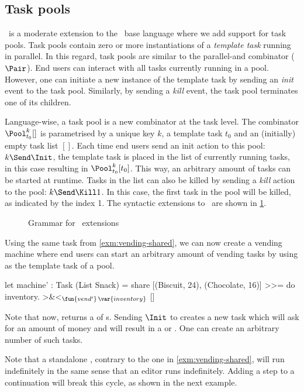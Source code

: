 \subsection{Task pools}

\DYNTOPHAT\ is a moderate extension to the \TOPHAT\ base language where we add support for task pools.
Task pools contain zero or more instantiations of a \emph{template task} running in parallel.
In this regard, task pools are similar to the parallel-and combinator ($\Pair$).
End users can interact with all tasks currently running in a pool.
However, one can initiate a new instance of the template task by sending an \emph{init} event to the task pool.
Similarly, by sending a \emph{kill} event, the task pool terminates one of its children.

Language-wise, a task pool is a new combinator at the task level.
The combinator $\Pool^k_{t_0} []$ is parametrised by a unique key $k$, a template task $t_0$ and an (initially) empty task list $[]$.
Each time end users send an init action to this pool: $k\Send\Init$, the template task is placed in the list of currently running tasks,
in this case resulting in $\Pool^k_{t_0} [t_0]$.
This way, an arbitrary amount of tasks can be started at runtime.
Tasks in the list can also be killed by sending a \emph{kill} action to the pool: $k\Send\Kill1$.
In this case, the first task in the pool will be killed, as indicated by the index 1.
The syntactic extensions to \TOPHAT\ are shown in \cref{fig:dynamic-grammar}.

\begin{figure}
  \caption{Grammar for \DYNTOPHAT\ extensions}
  \label{fig:dynamic-grammar}
\end{figure}

\begin{example}
  \label{exm:vending-dynamic}
  Using the same  task from \cref{exm:vending-shared},
  we can now create a vending machine where end users can start an arbitrary amount of vending tasks
  by using  as the template task of a pool.
  \begin{TASK}[emph={inventory}]
    let machine' : Task (List Snack) =
      share [(Biscuit, 24), (Chocolate, 16)] >>= do inventory.
      >&<$_{\fun{vend'}\,\var{inventory}}$ []
  \end{TASK}
  Note that now,  returns a  of s.
  Sending $\Init$ to  creates a new  task
  which will ask for an amount of money and will result in a  or .
  One can create an arbitrary number of such tasks.

  Note that a standalone , contrary to the one in \cref{exm:vending-shared}, will run indefinitely
  in the same sense that an editor runs indefinitely.
  Adding a step to a continuation will break this cycle,
  as shown in the next example.
\end{example}

